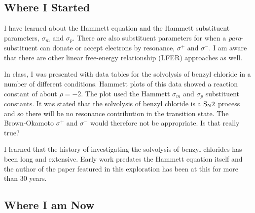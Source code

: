 \documentclass{tufte-handout}
\begin{document}
\subsection{Where I Started}



I have learned about the Hammett equation and the Hammett substituent parameters, $\sigma_m$ and $\sigma_p$. There are also substituent parameters for when a \textit{para}-substituent can donate or accept electrons by resonance, $\sigma^+$ and $\sigma^-$. I am aware that there are other linear free-energy relationship (LFER) approaches as well.

In class, I was presented with data tables for the solvolysis of benzyl chloride in a number of different conditions. Hammett plots of this data showed a reaction constant of about $\rho = -2$. The plot used the Hammett $\sigma_m$ and $\sigma_p$ substituent constants. It was stated that the solvolysis of benzyl chloride is a $\rm S_N2$ process and so there will be no resonance contribution in the transition state. The Brown-Okamoto $\sigma^+$ and $\sigma^-$ would therefore not be appropriate.  Is that really true?

I learned that the history of investigating the solvolysis of benzyl chlorides has been long and extensive. Early work predates the Hammett equation itself and the author of the paper featured in this exploration has been at this for more than 30 years. 


\subsection{Where I am Now}
\end{document}
